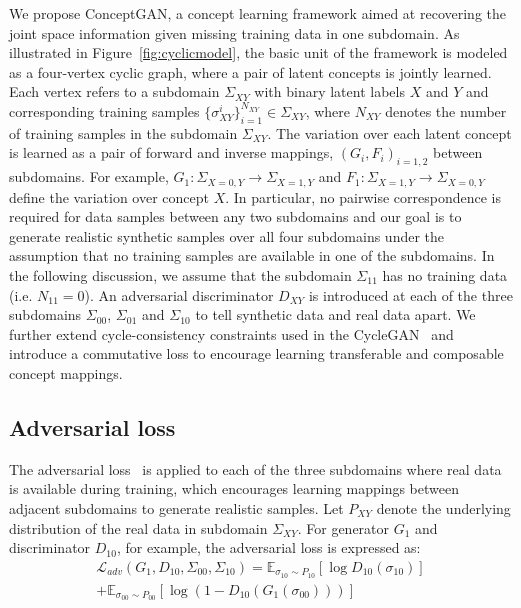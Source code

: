 \documentclass[10pt,twocolumn,letterpaper]{article}
\begin{document}
We propose ConceptGAN, a concept learning framework aimed at recovering the joint space information given missing training data in one subdomain. As illustrated in Figure~\ref{fig:cyclicmodel}, the basic unit of the framework is modeled as a four-vertex cyclic graph, where a pair of latent concepts is jointly learned. Each vertex refers to a subdomain $\Sigma_{XY}$ with binary latent labels $X$ and $Y$ and corresponding training samples $\{\sigma_{XY}^i\}_{i=1}^{N_{XY}}\in\Sigma_{XY}$, where $N_{XY}$ denotes the number of training samples in the subdomain $\Sigma_{XY}$. The variation over each latent concept is learned as a pair of forward and inverse mappings, $(G_i,F_i)_{i=1,2}$ between subdomains. For example, $G_1 : \Sigma_{X=0,Y}\rightarrow \Sigma_{X=1,Y}$ and $F_1 : \Sigma_{X=1,Y}\rightarrow \Sigma_{X=0,Y}$ define the variation over concept $X$. In particular, no pairwise correspondence is required for data samples between any two subdomains and our goal is to generate realistic synthetic samples over all four subdomains under the assumption that no training samples are available in one of the subdomains. In the following discussion, we assume that the subdomain $\Sigma_{11}$ has no training data (i.e. $N_{11}=0$). An adversarial discriminator $D_{XY}$ is introduced at each of the three subdomains $\Sigma_{00}$, $\Sigma_{01}$ and $\Sigma_{10}$ to tell synthetic data and real data apart. We further extend cycle-consistency constraints used in the CycleGAN~\cite{CycleGAN} and introduce a commutative loss to encourage learning transferable and composable concept mappings.

\subsection{Adversarial loss}

The adversarial loss~\cite{GAN} is applied to each of the three subdomains where real data is available during training, which encourages learning mappings between adjacent subdomains to generate realistic samples. Let $P_{XY}$ denote the underlying distribution of the real data in subdomain $\Sigma_{XY}$. For generator $G_1$ and discriminator $D_{10}$, for example, the adversarial loss is expressed as:
\begin{equation}
\begin{split}
\mathcal{L}_{adv}(G_1,D_{10},\Sigma_{00},\Sigma_{10}) {}=
\mathbb{E}_{\sigma_{10}\sim P_{10}}[\log D_{10}(\sigma_{10})]\\
+\mathbb{E}_{\sigma_{00}\sim P_{00}}[\log(1- D_{10}(G_1(\sigma_{00})))]
\end{split}
\end{equation}
\end{document}
